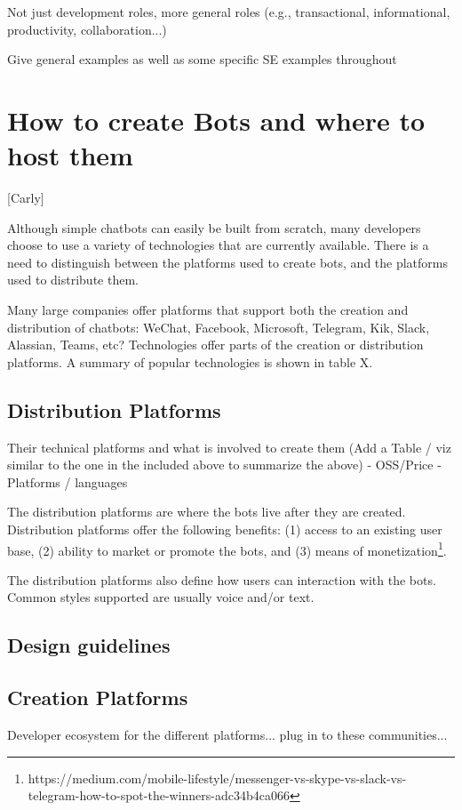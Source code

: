 \documentclass{sig-alternate}
\begin{document}
	Not just development roles, more general roles (e.g., transactional, informational, productivity, collaboration...)
	
	Give general examples as well as some specific SE examples throughout 


\section{How to create Bots and where to host them}
	[Carly]

	Although simple chatbots can easily be built from scratch, many developers choose to use a variety of technologies that are currently available. There is a need to distinguish between the platforms used to create bots, and the platforms used to distribute them.

	Many large companies offer platforms that support both the creation and distribution of chatbots: WeChat, Facebook, Microsoft, Telegram, Kik, Slack, Alassian, Teams, etc?
	Technologies offer parts of the creation or distribution platforms. A summary of popular technologies is shown in table X. 


	\subsection{Distribution Platforms}
	Their technical platforms and what is involved to create them (Add a Table / viz similar to the one in the included above to summarize the above)
	- OSS/Price
	- Platforms / languages

	The distribution platforms are where the bots live after they are created.  Distribution platforms offer the following benefits: (1) access to an existing user base, (2) ability to market or promote the bots, and (3) means of monetization\footnote{\label{messenger-vs-skype-vs-slack-vs-telegram-how-to-spot-the-winners-adc34b4ca066}https://medium.com/mobile-lifestyle/messenger-vs-skype-vs-slack-vs-telegram-how-to-spot-the-winners-adc34b4ca066}.  

	The distribution platforms also define how users can interaction with the bots.  Common styles supported are usually voice and/or text.

	\subsection{Design guidelines}

	\subsection{Creation Platforms}
	Developer ecosystem for the different platforms...  plug in to these communities...
\end{document}
